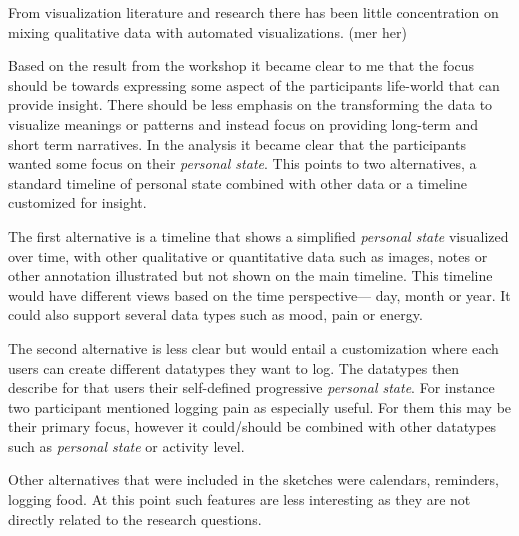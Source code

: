 \documentclass[11pt,UKenglish, a4paper]{article}
\begin{document}
From visualization literature and research there has been little concentration on mixing qualitative data with automated visualizations. (mer her)

Based on the result from the workshop it became clear to me that the focus should be towards expressing some aspect of the participants life-world that can provide insight. There should be less emphasis on the transforming the data to visualize meanings or patterns and instead focus on providing long-term and short term narratives. In the analysis it became clear that the participants wanted some focus on their \textit{personal state}. 
This points to two alternatives, a standard timeline of personal state combined with other data or a timeline customized for insight. 

The first alternative is a timeline that shows a simplified \textit{personal state} visualized over time, with other qualitative or quantitative data such as images, notes or other annotation illustrated but not shown on the main timeline. This timeline would have different views based on the time perspective--- day, month or year. It could also support several data types such as mood, pain or energy.

The second alternative is less clear but would entail a customization where each users can create different datatypes they want to log. The datatypes then describe for that users their self-defined progressive \textit{personal state}. For instance two participant mentioned logging pain as especially useful. For them this may be their primary focus, however it could/should be combined with other datatypes such as \textit{personal state} or activity level. 

Other alternatives that were included in the sketches were calendars, reminders, logging food. At this point such features are less interesting as they are not directly related to the research questions. 
\end{document}
